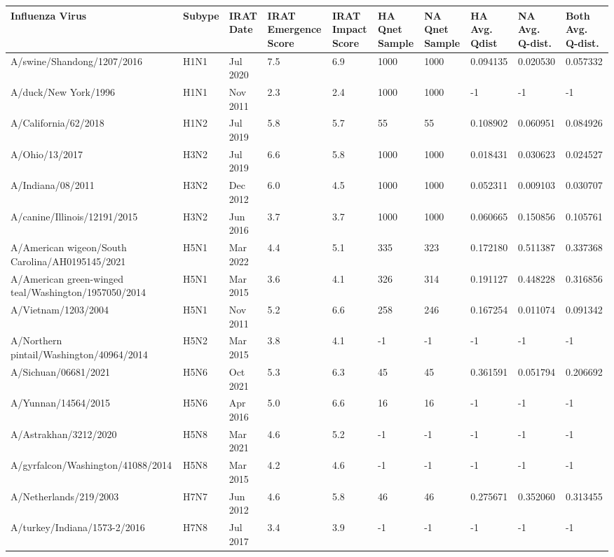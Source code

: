 \begin{tabular}{L{1.9in}|L{.35in}|L{.35in}|L{.35in}|L{.35in}|L{.35in}|L{.35in}|L{.42in}|L{.42in}|L{.42in}}\hline
Influenza Virus & Subype & IRAT Date &IRAT Emergence Score &IRAT Impact Score &HA Qnet Sample &NA Qnet Sample &HA Avg. Qdist &NA Avg. Q-dist. &Both Avg. Q-dist. \\\hline
A/swine/Shandong/1207/2016 & H1N1 & Jul 2020 & 7.5 &6.9 & 1000 &1000 &0.094135 &0.020530 &0.057332 \\\hline
A/duck/New York/1996 & H1N1 & Nov 2011 & 2.3 &2.4 & 1000 &1000 & -1 & -1 & -1 \\\hline
A/California/62/2018 & H1N2 & Jul 2019 & 5.8 &5.7 &55 &55 &0.108902 &0.060951 &0.084926 \\\hline
A/Ohio/13/2017 & H3N2 & Jul 2019 & 6.6 &5.8 & 1000 &1000 &0.018431 &0.030623 &0.024527 \\\hline
A/Indiana/08/2011 & H3N2 & Dec 2012 & 6.0 &4.5 & 1000 &1000 &0.052311 &0.009103 &0.030707 \\\hline
A/canine/Illinois/12191/2015 & H3N2 & Jun 2016 & 3.7 &3.7 &1000 &1000 &0.060665 &0.150856 &0.105761 \\\hline
A/American wigeon/South Carolina/AH0195145/2021 & H5N1 & Mar 2022 & 4.4 &5.1 & 335 & 323 &0.172180 &0.511387 &0.337368 \\\hline
A/American green-winged teal/Washington/1957050/2014 & H5N1 & Mar 2015 & 3.6 &4.1 &326 & 314 &0.191127 &0.448228 &0.316856 \\\hline
A/Vietnam/1203/2004 & H5N1 & Nov 2011 & 5.2 &6.6 & 258 & 246 &0.167254 &0.011074 &0.091342 \\\hline
A/Northern pintail/Washington/40964/2014 & H5N2 & Mar 2015 & 3.8 &4.1 & -1 &-1 & -1 & -1 & -1 \\\hline
A/Sichuan/06681/2021 & H5N6 & Oct 2021 & 5.3 &6.3 &45 &45 &0.361591 &0.051794 &0.206692 \\\hline
A/Yunnan/14564/2015 & H5N6 & Apr 2016 & 5.0 &6.6 & 16 &16 & -1 & -1 & -1 \\\hline
A/Astrakhan/3212/2020 & H5N8 & Mar 2021 & 4.6 &5.2 &-1 &-1 & -1 & -1 & -1 \\\hline
A/gyrfalcon/Washington/41088/2014 & H5N8 & Mar 2015 & 4.2 &4.6 &-1 &-1 & -1 & -1 & -1 \\\hline
A/Netherlands/219/2003 & H7N7 & Jun 2012 & 4.6 &5.8 &46 &46 &0.275671 &0.352060 &0.313455 \\\hline
A/turkey/Indiana/1573-2/2016 & H7N8 & Jul 2017 & 3.4 &3.9 &-1 &-1 & -1 & -1 & -1 \\\hline

\end{tabular}
